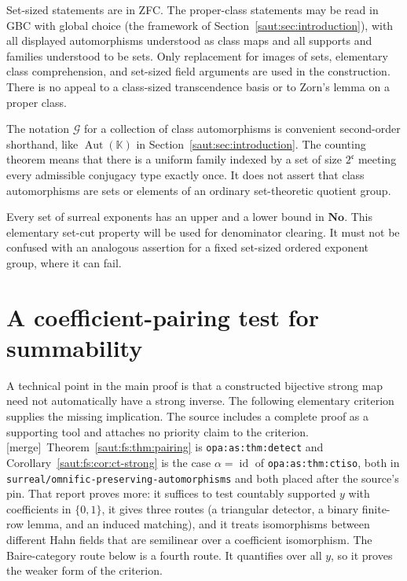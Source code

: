 \documentclass[11pt]{article}
\theoremstyle{definition}
\theoremstyle{remark}
\newcommand{\No}{\mathbf{No}}
\newcommand{\K}{\mathbb K}
\newcommand{\id}{\operatorname{id}}
\newcommand{\Aut}{\operatorname{Aut}}
\newcommand{\repo}[1]{\nolinkurl{#1}}%
\newcommand{\lbl}[1]{\nolinkurl{#1}}%
\newcommand{\cc}{\mathfrak c}
\newcommand{\mergetag}{\textup{[merge]}}
\numberwithin{equation}{section}
\begin{document}
Set-sized statements are in ZFC. The proper-class statements may be read in GBC
with global choice (the framework of Section~\ref{saut:sec:introduction}), with all
displayed automorphisms understood as class maps and all supports and families
understood to be sets. Only replacement for images of sets, elementary class
comprehension, and set-sized field arguments are used in the construction. There
is no appeal to a class-sized transcendence basis or to Zorn's lemma on a proper
class.

The notation $\mathcal G$ for a collection of class automorphisms is convenient
second-order shorthand, like $\Aut(\K)$ in Section~\ref{saut:sec:introduction}. The
counting theorem means that there is a uniform family indexed by a set of size
$2^{\cc}$ meeting every admissible conjugacy type exactly once. It does not assert
that class automorphisms are sets or elements of an ordinary set-theoretic quotient
group.

Every set of surreal exponents has an upper and a lower bound in $\No$. This
elementary set-cut property will be used for denominator clearing. It must not be
confused with an analogous assertion for a fixed set-sized ordered exponent group,
where it can fail.

\section{A coefficient-pairing test for summability}\label{saut:fs:sec:pairing}

A technical point in the main proof is that a constructed bijective strong map need
not automatically have a strong inverse. The following elementary criterion
supplies the missing implication. The source includes a complete proof as a
supporting tool and attaches no priority claim to the criterion.
\mergetag\ Theorem~\ref{saut:fs:thm:pairing} is \lbl{opa:as:thm:detect} and
Corollary~\ref{saut:fs:cor:ct-strong} is the case $\alpha=\id$ of
\lbl{opa:as:thm:ctiso}, both in \repo{surreal/omnific-preserving-automorphisms}
and both placed after the source's pin. That report proves more: it suffices to
test countably supported $y$ with coefficients in $\{0,1\}$, it gives three routes
(a triangular detector, a binary finite-row lemma, and an induced matching), and
it treats isomorphisms between different Hahn fields that are semilinear over a
coefficient isomorphism. The Baire-category route below is a fourth route. It
quantifies over all $y$, so it proves the weaker form of the criterion.
\end{document}
